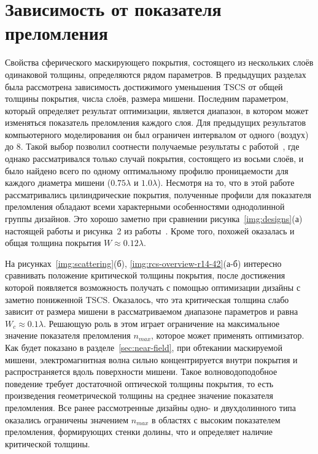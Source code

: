 \section{Зависимость от показателя преломления}

Свойства сферического маскирующего покрытия, состоящего из нескольких
слоёв одинаковой толщины, определяются рядом параметров. В предыдущих
разделах была рассмотрена зависимость достижимого уменьшения TSCS от
общей толщины покрытия, числа слоёв, размера мишени. Последним
параметром, который определяет результат оптимизации, является
диапазон, в котором может изменяться показатель преломления каждого
слоя.  Для предыдущих результатов компьютерного моделирования он был
ограничен интервалом от одного (воздух) до $8$.  Такой выбор позволил
соотнести получаемые результаты с работой~\cite{semouchkina2}, где
однако рассматривался только случай покрытия, состоящего из восьми
слоёв, и было найдено всего по одному оптимальному профилю
проницаемости для каждого диаметра мишени ($0.75\lambda$ и
$1.0\lambda$). Несмотря на то, что в этой работе рассматривались
цилиндрические покрытия, полученные профили для показателя
преломления обладают всеми характерными особенностями однодолинной
группы дизайнов. Это хорошо заметно при сравнении
рисунка~\ref{img:designs}(а) настоящей работы и рисунка~2 из
работы~\cite{semouchkina2}. Кроме того, похожей оказалась и общая
толщина покрытия $W\approx 0.12\lambda$.

На рисунках~\ref{img:scattering}(б),
\ref{img:rcs-overview-r14-42}(а-б) интересно сравнивать положение
критической толщины покрытия, после достижения которой появляется
возможность получать с помощью оптимизации дизайны с заметно
пониженной TSCS.  Оказалось, что эта критическая толщина слабо зависит
от размера мишени в рассматриваемом диапазоне параметров и равна
${W_c \approx 0.1\lambda}$.  Решающую роль в этом играет ограничение
на максимальное значение показателя преломления $n_{max}$, которое
может применять оптимизатор.  Как будет показано в
разделе~\ref{sec:near-field}, при обтекании маскируемой мишени,
электромагнитная волна сильно концентрируется внутри покрытия и
распространяется вдоль поверхности мишени.  Такое волноводоподобное
поведение требует достаточной оптической толщины покрытия, то есть
произведения геометрической толщины на среднее значение показателя
преломления. Все ранее рассмотренные дизайны одно- и двухдолинного
типа оказались ограничены значением $n_{max}$ в областях с высоким
показателем преломления, формирующих стенки долины, что и определяет
наличие критической толщины.

